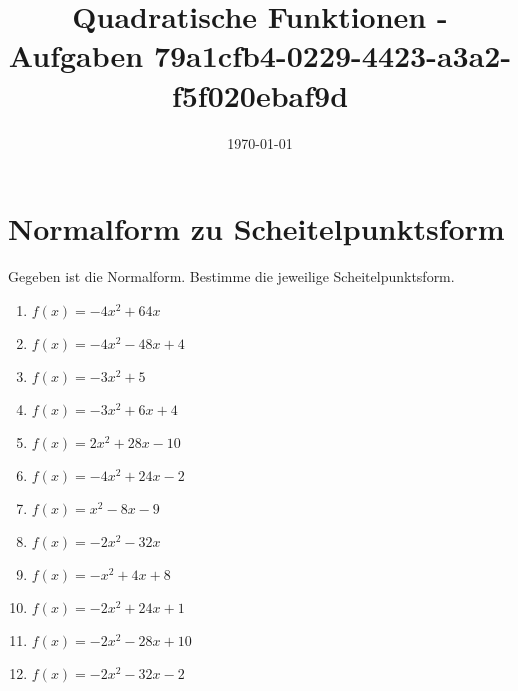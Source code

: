 \documentclass{article}%
\title{Quadratische Funktionen - Aufgaben \newline 79a1cfb4-0229-4423-a3a2-f5f020ebaf9d}%
\date{\today}%
\begin{document}
%
\normalsize%
\maketitle%
\section{Normalform zu Scheitelpunktsform}%
\label{sec:NormalformzuScheitelpunktsform}%
Gegeben ist die Normalform. Bestimme die jeweilige Scheitelpunktsform.%
\begin{enumerate}[label=\alph*)]%
\item%
\newline\vspace{0.5cm} $f(x)=-4x^2 + 64x$%
\item%
\newline\vspace{0.5cm} $f(x)=-4x^2 - 48x + 4$%
\item%
\newline\vspace{0.5cm} $f(x)=-3x^2 + 5$%
\item%
\newline\vspace{0.5cm} $f(x)=-3x^2 + 6x + 4$%
\item%
\newline\vspace{0.5cm} $f(x)=2x^2 + 28x - 10$%
\item%
\newline\vspace{0.5cm} $f(x)=-4x^2 + 24x - 2$%
\item%
\newline\vspace{0.5cm} $f(x)=x^2 - 8x - 9$%
\item%
\newline\vspace{0.5cm} $f(x)=-2x^2 - 32x$%
\item%
\newline\vspace{0.5cm} $f(x)=-x^2 + 4x + 8$%
\item%
\newline\vspace{0.5cm} $f(x)=-2x^2 + 24x + 1$%
\item%
\newline\vspace{0.5cm} $f(x)=-2x^2 - 28x + 10$%
\item%
\newline\vspace{0.5cm} $f(x)=-2x^2 - 32x - 2$%

\end{enumerate}
\end{document}
